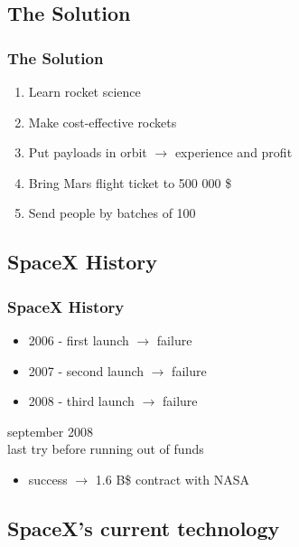 \subsection{The Solution}

\begin{frame}
    \frametitle{The Solution}
    \begin{enumerate}
        \item Learn rocket science
        \pause
        \item Make cost-effective rockets
        \pause
        \item Put payloads in orbit $\rightarrow$ experience and profit
        \pause
        \item Bring Mars flight ticket to 500 000 \$
        \pause
        \item Send people by batches of 100
    \end{enumerate}
\end{frame}

\subsection{SpaceX History}

\begin{frame}
    \frametitle{SpaceX History}

    \begin{itemize}
        \item 2006 - first launch  $\rightarrow$ failure
        \item 2007 - second launch $\rightarrow$ failure
        \item 2008 - third launch  $\rightarrow$ failure

    \end{itemize}
    \vspace{1em}
    \pause

    september 2008\\
    last try before running out of funds\\
    \begin{itemize}
        \item success $\rightarrow$ 1.6 B\$ contract with NASA
    \end{itemize}
\end{frame}

\subsection{SpaceX's current technology}

